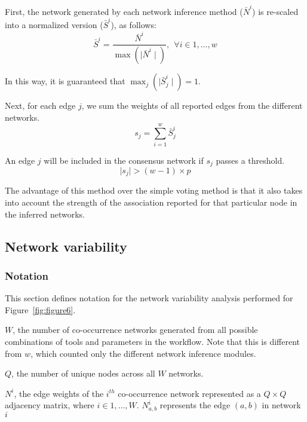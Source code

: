   First, the network generated by each network inference method ($\bar{N}^i$) is re-scaled into a normalized version ($\bar{S}^i$), as follows:
  \begin{equation}
    \bar{S}^{i} = \frac{\bar{N}^{i}}{\max(\mid \bar{N}^{i} \mid)},~~\forall i \in {1, \dots, w}
    \label{eqn:scaled-sum-rescaling}
  \end{equation}

    In this way, it is guaranteed that $\max_{j}(\mid \bar{S}^i_j \mid) = 1$.


  Next, for each edge $j$, we sum the weights of all reported edges from the different networks.
  \begin{equation}
    s_j = \sum_{i=1}^{w} \bar{S}^i_j
    \label{eqn:scaled-sum}
  \end{equation}


  An edge $j$ will be included in the consensus network if $s_j$ passes a threshold.
  \begin{equation}
    \mid s_j \mid > (w - 1) \times p
    \label{eq:scaled-sum2}
  \end{equation}

  The advantage of this method over the simple voting method is that it also takes into account the strength of the association reported for that particular node in the inferred networks.

  \subsection*{Network variability}

  \subsubsection*{Notation}
  \vspace{-5mm}
  This section defines notation for the network variability analysis performed for Figure~\ref{fig:figure6}.

  $W$, the number of co-occurrence networks generated from all possible combinations of tools and parameters in the workflow.
  Note that this is different from $w$, which counted only the different network inference modules.

  $Q$, the number of unique nodes across all $W$ networks.

  $N^i$, the edge weights of the $i^{th}$ co-occurrence network represented as a $Q \times Q$ adjacency matrix, where $i \in {1, \dots, W}$.
  $N^i_{a,b}$ represents the edge $(a,b)$ in network $i$

